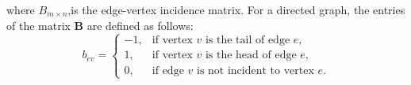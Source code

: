 \documentclass{article} %
\theoremstyle{bfnote}
\begin{document}
where $B_{m \times n}$,is the edge-vertex incidence matrix.
For a directed graph, the entries of the matrix $ \bm{B} $ are defined as follows:
\vspace{-2pt}
\begin{equation*}
	b_{e v} =
	\begin{cases}
		-1, & \text{if vertex } v \text{ is the tail of edge } e, \\
		1,  & \text{if vertex } v \text{ is the head of edge } e, \\
		0,  & \text{if edge } v \text{ is not incident to vertex } e.
	\end{cases}
\end{equation*}



\end{document}
